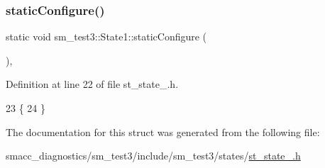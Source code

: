 \subsubsection{\texorpdfstring{static\+Configure()}{staticConfigure()}}
{\footnotesize\ttfamily static void sm\+\_\+test3\+::\+State1\+::static\+Configure (\begin{DoxyParamCaption}{ }\end{DoxyParamCaption})\hspace{0.3cm}{\ttfamily [inline]}, {\ttfamily [static]}}



Definition at line 22 of file st\+\_\+state\+\_.\+h.


\begin{DoxyCode}
23     \{
24     \}
\end{DoxyCode}


The documentation for this struct was generated from the following file\+:\begin{DoxyCompactItemize}
\item 
smacc\+\_\+diagnostics/sm\+\_\+test3/include/sm\+\_\+test3/states/\hyperlink{smacc__diagnostics_2sm__test3_2include_2sm__test3_2states_2st__state__1_8h}{st\+\_\+state\+\_.\+h}\end{DoxyCompactItemize}
